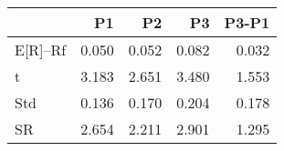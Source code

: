\begin{tabular}{lrrrr}
\toprule
 & P1 & P2 & P3 & P3-P1 \\
\midrule
E[R]--Rf & 0.050 & 0.052 & 0.082 & 0.032 \\
t & 3.183 & 2.651 & 3.480 & 1.553 \\
Std & 0.136 & 0.170 & 0.204 & 0.178 \\
SR & 2.654 & 2.211 & 2.901 & 1.295 \\
\bottomrule
\end{tabular}
